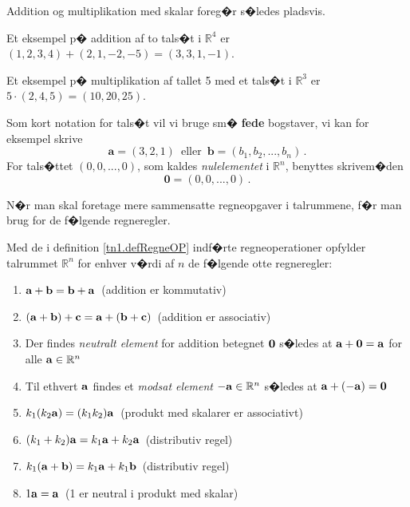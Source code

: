 Addition og multiplikation med skalar foreg�r s�ledes pladsvis.

\begin{example}
Et eksempel p� addition af to tals�t i  $\mathbb R ^4$ er
$(1,2,3,4)+(2,1,-2,-5)=(3,3,1,-1)$.
\end{example}
\begin{example}
Et eksempel p� multiplikation af tallet 5 med et tals�t i  $\mathbb R ^3$ er
$5\cdot(2,4,5)=(10,20,25)$.
\end{example}

Som kort notation for tals�t vil vi bruge sm� \textbf{fede} bogstaver, vi kan for eksempel skrive 
$$\mathbf{a}=(3,2,1)\,\,\,\mathrm{eller}\,\,\,\mathbf{b}=(b_1,b_2,...,b_n)\,.$$
For tals�ttet $(0,0,...,0)$, som kaldes \emph{nulelementet} i $\mathbb R ^n$, benyttes skrivem�den $$\mathbf{0}=(0,0,...,0)\,.$$

N�r man skal foretage mere sammensatte regneopgaver i talrummene, f�r man brug for de f�lgende regneregler.

\begin{theorem}
Med de i definition \ref{tn1.defRegneOP} indf�rte regneoperationer opfylder talrummet $\mathbb R ^n$ for enhver v�rdi af $n$ de f�lgende otte regneregler:
\begin{enumerate}
\item
$ \mathbf{a} + \mathbf{b} = \mathbf{b} + \mathbf{a} $ \,(addition er kommutativ) 
\item
$ (\mathbf{a} + \mathbf{b}) + \mathbf{c} = \mathbf{a} + (\mathbf{b} + \mathbf{c}) $ \,(addition er associativ) 
\item
Der findes \textit{neutralt element} for addition betegnet $\bm{0}$ s�ledes at $\mathbf{a} + \bm{0} = \mathbf{a} $ for alle $\mathbf{a} \in \mathbb{R}^n$ 
\item
Til ethvert $\mathbf{a}$ findes et \textit{modsat element} $-\mathbf{a} \in \mathbb{R}^n$ s�ledes at $ \mathbf{a} + (-\mathbf{a}) = \bm{0} $ 
\item
$ k_1(k_2\mathbf{a}) = (k_1k_2)\mathbf{a} $ \,(produkt med skalarer er associativt) 
\item
$ (k_1 + k_2)\mathbf{a} = k_1\mathbf{a} + k_2\mathbf{a} $ \,(distributiv regel) 
\item
$ k_1(\mathbf{a}+\mathbf{b}) = k_1\mathbf{a} + k_1\mathbf{b} $ \,(distributiv regel)  
\item
$ 1\mathbf{a} = \mathbf{a} $ \,(1 er neutral i produkt med skalar) 
\end{enumerate}
\end{theorem}

